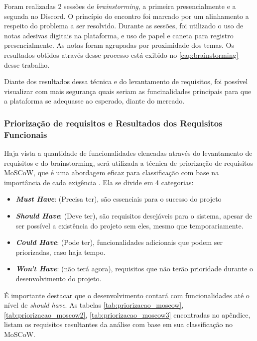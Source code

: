         Foram realizadas 2 sessões de \textit{brainstorming}, a primeira presencialmente e a segunda no Discord. O princípio do encontro foi marcado por um alinhamento a respeito do problema a ser resolvido. Durante as sessões, foi utilizado o uso de notas adesivas digitais na plataforma, e uso de papel e caneta para registro presencialmente. As notas foram agrupadas por proximidade dos temas. Os resultados obtidos através desse processo está exibido no \autoref{cap:brainstorming} desse trabalho. 

        Diante dos resultados dessa técnica e do levantamento de requisitos, foi possível visualizar com mais segurança quais seriam as funcinalidades principais para que a plataforma se adequasse ao esperado, diante do mercado.

        \subsubsection{Priorização de requisitos e Resultados dos Requisitos Funcionais}
        \label{sec:priorizacao}
        Haja vista a quantidade de funcionalidades elencadas através do levantamento de requisitos e do brainstorming, será utilizada a técnica de priorização de requisitos MoSCoW, que é uma abordagem eficaz para classificação com base na importância de cada exigência \cite{cottrell1999}. Ela se divide em 4 categorias:

        \begin{itemize}
            \item \textbf{\textit{Must Have}}: (Precisa
            ter), são essenciais para o sucesso do projeto
            \item \textbf{\textit{Should Have}}: (Deve ter), são requisitos desejáveis para o sistema, apesar de ser possível a existência do projeto sem eles, mesmo que temporariamente.
            \item \textbf{\textit{Could Have}}: (Pode ter), funcionalidades adicionais que podem ser priorizadas, caso haja tempo.
            \item \textbf{\textit{Won’t Have}}: (não terá agora), requisitos que não terão prioridade durante o desenvolvimento do projeto.
        \end{itemize}

        É importante destacar que o desenvolvimento contará com funcionalidades até o nível de \textit{should have}.
        As tabelas \ref{tab:priorizacao_moscow}, \ref{tab:priorizacao_moscow2}, \ref{tab:priorizacao_moscow3} encontradas no apêndice, listam os requisitos resultantes da análise com base em sua classificação no MoSCoW.

